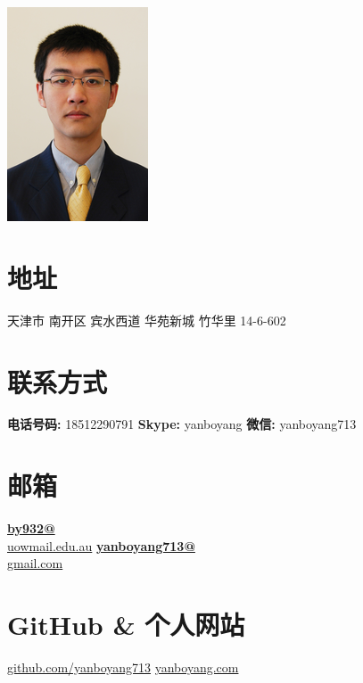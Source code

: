 \documentclass[]{friggeri-cv}
\begin{document}
     

\begin{aside}
  \includegraphics[scale=0.07]{img/boyang.png}
  \section{地址}
  天津市 南开区 宾水西道 华苑新城 竹华里 14-6-602
    ~
  \section{联系方式}
    \textbf{电话号码:} 18512290791
    \textbf{Skype:} yanboyang
    \textbf{微信:} yanboyang713
    ~
  \section{邮箱}
    \href{mailto:by932@uowmail.edu.au}{\textbf{by932@}\\uowmail.edu.au}
    \href{mailto:yanboyang713@gmail.com}{\textbf{yanboyang713@}\\gmail.com}
    ~
  \section{GitHub \& 个人网站}
    \href{https://github.com/yanboyang713}{github.com/yanboyang713}
    \href{http://www.yanboyang.com}{yanboyang.com}
    ~

\end{aside}
\end{document}
